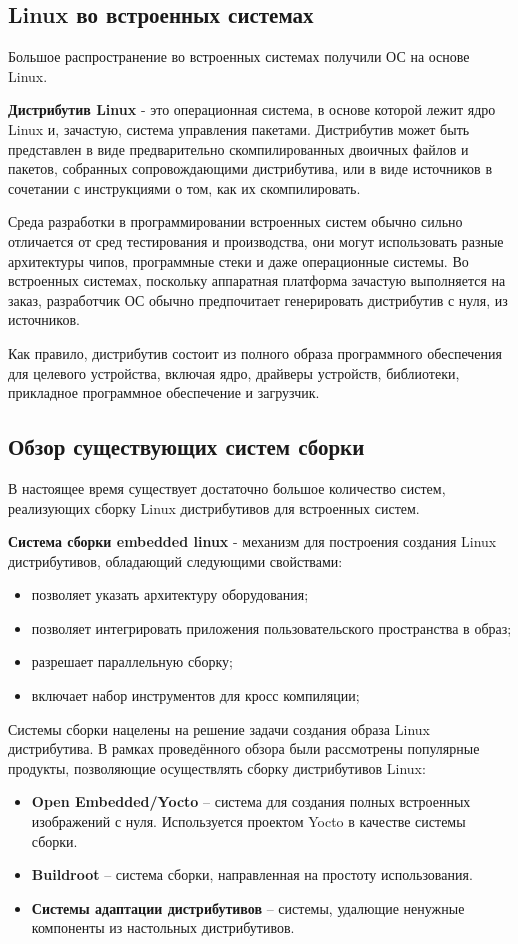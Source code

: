 \newpage
\subsection{Linux во встроенных системах}

Большое распространение во встроенных системах получили ОС на основе Linux.

\textbf{Дистрибутив Linux} - это операционная система, в основе которой лежит ядро Linux и, зачастую, система управления пакетами.
Дистрибутив может быть представлен в виде предварительно скомпилированных двоичных файлов и пакетов, собранных сопровождающими дистрибутива, или в виде источников в сочетании с инструкциями о том, как их скомпилировать.

Среда разработки в программировании встроенных систем обычно сильно отличается от сред тестирования и производства, они могут использовать разные архитектуры чипов, программные стеки и даже операционные системы.
Во встроенных системах, поскольку аппаратная платформа зачастую выполняется на заказ, разработчик ОС обычно предпочитает генерировать дистрибутив с нуля, из источников.

Как правило, дистрибутив состоит из полного образа программного обеспечения для целевого устройства, включая ядро, драйверы устройств, библиотеки, прикладное программное обеспечение и загрузчик.


\newpage
\subsection{Обзор существующих систем сборки}
В настоящее время существует достаточно большое количество систем, реализующих сборку Linux дистрибутивов для встроенных систем.

\textbf{Система сборки embedded linux} - механизм для построения создания Linux дистрибутивов, обладающий следующими свойствами:
\begin{itemize}
  \item позволяет указать архитектуру оборудования;
  \item позволяет интегрировать приложения пользовательского пространства в образ;
  \item разрешает параллельную сборку;
  \item включает набор инструментов для кросс компиляции;
\end{itemize}

Системы сборки нацелены на решение задачи создания образа Linux дистрибутива.
В рамках проведённого обзора были рассмотрены популярные продукты, позволяющие осуществлять сборку дистрибутивов Linux:
\begin{itemize}
  \item \textbf{Open Embedded/Yocto} -- система для создания полных встроенных изображений с нуля. Используется проектом Yocto в качестве системы сборки.
  \item \textbf{Buildroot} -- система сборки, направленная на простоту использования.
  \item \textbf{Системы адаптации дистрибутивов} -- системы, удалющие ненужные компоненты из настольных дистрибутивов.
\end{itemize}
\newpage
